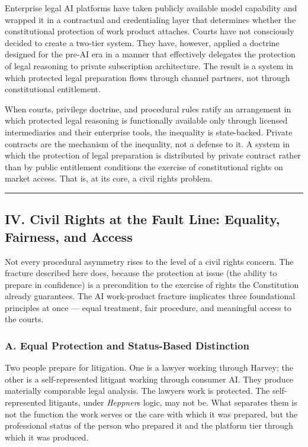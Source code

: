\documentclass[
  12pt,
]{article}
\begin{document}
Enterprise legal AI platforms have taken publicly available model
capability and wrapped it in a contractual and credentialing layer that
determines whether the constitutional protection of work product
attaches. Courts have not consciously decided to create a two-tier
system. They have, however, applied a doctrine designed for the pre-AI
era in a manner that effectively delegates the protection of legal
reasoning to private subscription architecture. The result is a system
in which protected legal preparation flows through channel partners, not
through constitutional entitlement.

When courts, privilege doctrine, and procedural rules ratify an
arrangement in which protected legal reasoning is functionally available
only through licensed intermediaries and their enterprise tools, the
inequality is state-backed. Private contracts are the mechanism of the
inequality, not a defense to it. A system in which the protection of
legal preparation is distributed by private contract rather than by
public entitlement conditions the exercise of constitutional rights on
market access. That is, at its core, a civil rights problem.

\begin{center}\rule{0.5\linewidth}{0.5pt}\end{center}

\subsection{IV. Civil Rights at the Fault Line: Equality, Fairness, and
Access}\label{iv-civil-rights-at-the-fault-line-equality-fairness-and-access}

Not every procedural asymmetry rises to the level of a civil rights
concern. The fracture described here does, because the protection at
issue (the ability to prepare in confidence) is a precondition to the
exercise of rights the Constitution already guarantees. The AI
work-product fracture implicates three foundational principles at once
--- equal treatment, fair procedure, and meaningful access to the
courts.

\subsubsection{A. Equal Protection and Status-Based
Distinction}\label{a-equal-protection-and-status-based-distinction}

Two people prepare for litigation. One is a lawyer working through
Harvey; the other is a self-represented litigant working through
consumer AI. They produce materially comparable legal analysis. The
lawyer\textquotesingle s work is protected. The self-represented
litigant\textquotesingle s, under \emph{Heppner}\textquotesingle s
logic, may not be. What separates them is not the function the work
serves or the care with which it was prepared, but the professional
status of the person who prepared it and the platform tier through which
it was produced.
\end{document}
